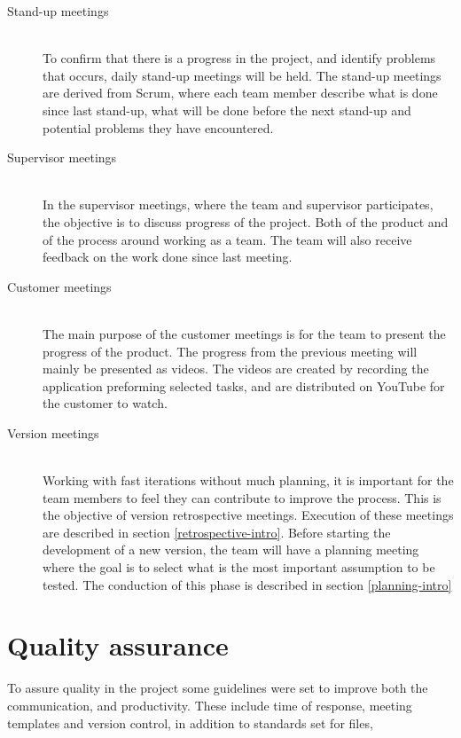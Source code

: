 \begin{description}
    \item[Stand-up meetings] \hfill\\ 
     To confirm that there is a progress in the project, and identify problems that occurs, daily stand-up meetings will be held. The stand-up meetings are derived from Scrum, where each team member describe what is done since last stand-up, what will be done before the next stand-up and potential problems they have encountered. \cite{scrum} 
   
    \item[Supervisor meetings] \hfill\\ 
    In the supervisor meetings, where the team and supervisor participates, the objective is to discuss progress of the project. Both of the product and of the process around working as a team. The team will also receive feedback on the work done since last meeting.
    
    \item[Customer meetings] \hfill\\ 
    The main purpose of the customer meetings is for the team to present the progress of the product. The progress from the previous meeting will mainly be presented as videos. The videos are created by recording the application preforming selected tasks, and are distributed on YouTube for the customer to watch.
   
    \item[Version meetings] \hfill\\ 
    Working with fast iterations without much planning, it is important for the team members to feel they can contribute to improve the process. This is the objective of version retrospective meetings. Execution of these meetings are described in section \ref{retrospective-intro}.
    Before starting the development of a new version, the team will have a planning meeting where the goal is to select what is the most important assumption to be tested. The conduction of this phase is described in section \ref{planning-intro} 

\end{description}
 
\section{Quality assurance}
To assure quality in the project some guidelines were set to improve both the communication, and productivity. These include time of response, meeting templates and version control, in addition to standards set for files, 

